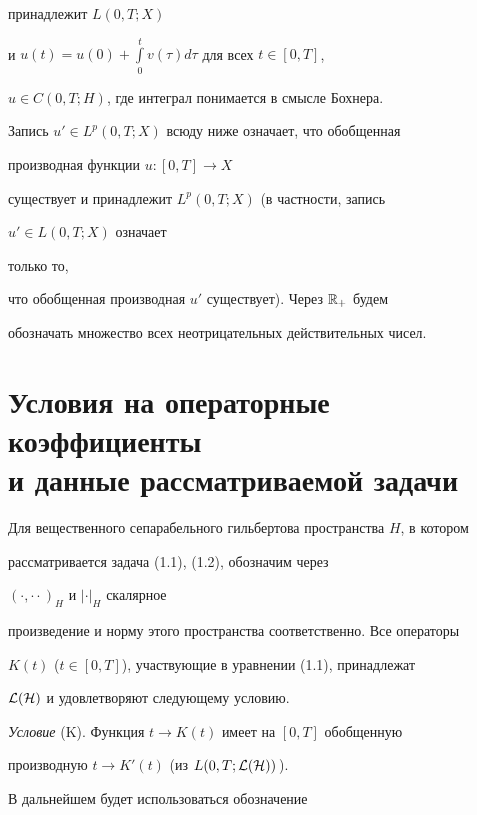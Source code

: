 принадлежит $L(0,T;X)$ 


и $u(t)=u(0)+\int\limits^t_0{}v(\tau)d\tau$ для всех $t\in[0,T]$, 


$u\in C(0,T;H)$, где интеграл понимается в смысле Бохнера. 


Запись $u'\in L^p(0,T;X)$ всюду ниже означает, что обобщенная 


производная функции $u:[0,T]\to X$ 


существует и принадлежит $L^p(0,T;X)$ (в частности, запись 


$u'\in L(0,T;X)$ означает 


только то, 


что обобщенная производная $u'$ существует). Через $\Bbb R_+$ будем 


обозначать множество всех неотрицательных действительных чисел. 


 


\section{Условия на операторные коэффициенты \protect\\


и данные рассматриваемой задачи} 


 


Для вещественного сепарабельного гильбертова пространства $H$, в котором 


рассматривается задача (1.1), (1.2), обозначим через 


$(\cdot,\cdot{}\cdot)_H$ и $|\cdot|_H$ скалярное 


произведение и норму этого пространства соответственно. Все операторы 


$K(t)$ ($t\in[0,T]$), участвующие в уравнении (1.1), принадлежат 


$\cal L(H)$ и удовлетворяют следующему условию. 


\medskip


 


{\it Условие} (K). Функция $t\to K(t)$ имеет на $[0,T]$ обобщенную 


производную $t\to K'(t)$ (из $L(0,T;\cal L(H))$\,). 


\medskip 


 


В дальнейшем будет использоваться обозначение 


